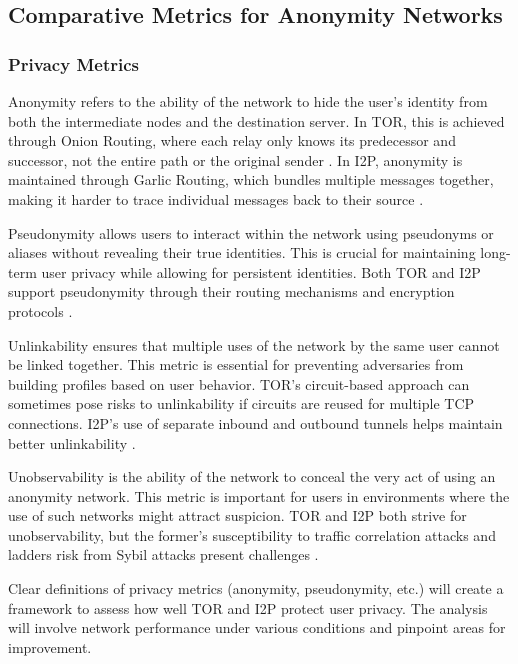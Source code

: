 \documentclass[12pt,conference]{IEEEtran}
\begin{document}
\subsection{Comparative Metrics for Anonymity Networks}
\subsubsection{Privacy Metrics}
Anonymity refers to the ability of the network to hide the user's identity from both the intermediate nodes and the destination server. In TOR, this is achieved through Onion Routing, where each relay only knows its predecessor and successor, not the entire path or the original sender \cite{aSurveyOnTORAndI2P} \cite{torAttacks}. In I2P, anonymity is maintained through Garlic Routing, which bundles multiple messages together, making it harder to trace individual messages back to their source \cite{TORVsI2P}.

Pseudonymity allows users to interact within the network using pseudonyms or aliases without revealing their true identities. This is crucial for maintaining long-term user privacy while allowing for persistent identities. Both TOR and I2P support pseudonymity through their routing mechanisms and encryption protocols \cite{TORVsI2P}.

Unlinkability ensures that multiple uses of the network by the same user cannot be linked together. This metric is essential for preventing adversaries from building profiles based on user behavior. TOR's circuit-based approach can sometimes pose risks to unlinkability if circuits are reused for multiple TCP connections. I2P's use of separate inbound and outbound tunnels helps maintain better unlinkability \cite{aSurveyOnTORAndI2P} \cite{torAttacks}.

Unobservability is the ability of the network to conceal the very act of using an anonymity network. This metric is important for users in environments where the use of such networks might attract suspicion. TOR and I2P both strive for unobservability, but the former's susceptibility to traffic correlation attacks and ladders  risk from Sybil attacks present challenges \cite{TORVsI2P}.

Clear definitions of privacy metrics (anonymity, pseudonymity, etc.) will create a framework to assess how well TOR and I2P protect user privacy. The analysis will involve network performance under various conditions and pinpoint areas for improvement.
\end{document}
